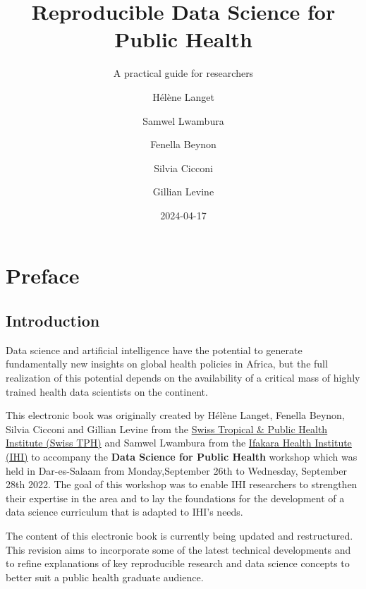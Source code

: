 \documentclass[
  letterpaper,
  DIV=11,
  numbers=noendperiod,
  oneside]{scrreprt}
\title{Reproducible Data Science for Public Health}
\subtitle{A practical guide for researchers}
\author{Hélène Langet \and Samwel Lwambura \and Fenella
Beynon \and Silvia Cicconi \and Gillian Levine}
\date{2024-04-17}
\renewcommand*\contentsname{Table of contents}
\newcommand\contentsname{Table of contents}
\begin{document}
\maketitle
\ifdefined\Shaded\renewenvironment{Shaded}{\begin{tcolorbox}[boxrule=0pt, frame hidden, borderline west={3pt}{0pt}{shadecolor}, interior hidden, breakable, sharp corners, enhanced]}{\end{tcolorbox}}\fi

\renewcommand*\contentsname{Table of contents}
{
\hypersetup{linkcolor=}
\setcounter{tocdepth}{2}
\tableofcontents
}

\hypertarget{preface}{%
\chapter*{Preface}\label{preface}}


\hypertarget{introduction}{%
\section*{Introduction}\label{introduction}}


Data science and artificial intelligence have the potential to generate
fundamentally new insights on global health policies in Africa, but the
full realization of this potential depends on the availability of a
critical mass of highly trained health data scientists on the continent.

This electronic book was originally created by Hélène Langet, Fenella
Beynon, Silvia Cicconi and Gillian Levine from the
\href{https://www.swisstph.ch}{Swiss Tropical \& Public Health Institute
(Swiss TPH)} and Samwel Lwambura from the
\href{https://ihi.or.tz/}{Ifakara Health Institute (IHI)} to accompany
the \textbf{Data Science for Public Health} workshop which was held in
Dar-es-Salaam from Monday,September 26th to Wednesday, September 28th
2022. The goal of this workshop was to enable IHI researchers to
strengthen their expertise in the area and to lay the foundations for
the development of a data science curriculum that is adapted to IHI's
needs.

The content of this electronic book is currently being updated and
restructured. This revision aims to incorporate some of the latest
technical developments and to refine explanations of key reproducible
research and data science concepts to better suit a public health
graduate audience.
\end{document}
